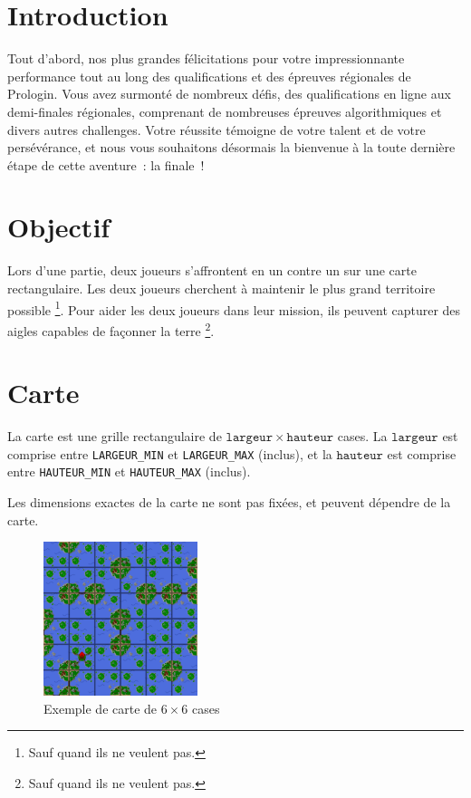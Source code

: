 \section{Introduction}
Tout d'abord, nos plus grandes félicitations pour votre impressionnante
performance tout au long des qualifications et des épreuves régionales
de Prologin.
Vous avez surmonté de nombreux défis, des qualifications en ligne
aux demi-finales régionales, comprenant de nombreuses épreuves
algorithmiques et divers autres challenges.
Votre réussite témoigne de votre talent et de votre persévérance,
et nous vous souhaitons désormais la bienvenue à la toute dernière
étape de cette aventure~: la finale~!

\section{Objectif}
Lors d'une partie, deux joueurs s'affrontent en un contre un sur une carte
rectangulaire.
Les deux joueurs cherchent à maintenir le plus grand territoire possible
\footnote{Sauf quand ils ne veulent pas.}.
Pour aider les deux joueurs dans leur mission, ils peuvent capturer des
aigles capables de façonner la terre
\footnote{Sauf quand ils ne veulent pas.}.

\section{Carte}
La carte est une grille rectangulaire de
$\mathtt{largeur} \times \mathtt{hauteur}$ cases.
La $\mathtt{largeur}$ est comprise entre \texttt{LARGEUR\_MIN} et
\texttt{LARGEUR\_MAX} (inclus), et la $\mathtt{hauteur}$ est comprise
entre \texttt{HAUTEUR\_MIN} et \texttt{HAUTEUR\_MAX} (inclus).

Les dimensions exactes de la carte ne sont pas fixées, et peuvent dépendre de
la carte.

\begin{figure}[h]
    \centering
    \includegraphics[width=0.4\textwidth]{img/sprites/carte.png}
    \caption{Exemple de carte de $6 \times 6$ cases}
\end{figure}

